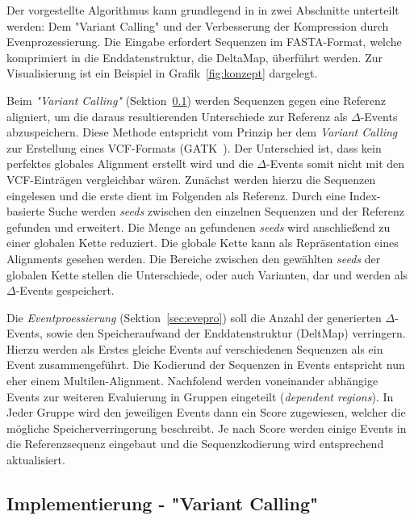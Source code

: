\documentclass[12pt]{article}
\begin{document}
Der vorgestellte Algorithmus kann grundlegend in in zwei Abschnitte unterteilt werden: Dem "Variant Calling" und der Verbesserung der Kompression durch Evenprozessierung. Die Eingabe erfordert Sequenzen im FASTA-Format, welche komprimiert in die Enddatenstruktur, die DeltaMap, überführt werden. Zur Visualisierung ist ein Beispiel in Grafik~\ref{fig:konzept} dargelegt.

Beim \emph{"Variant Calling"} (Sektion~\ref{sec:varcall}) werden Sequenzen gegen eine Referenz aligniert, um die daraus resultierenden Unterschiede zur Referenz als $\Delta$-Events abzuspeichern. Diese Methode entspricht vom Prinzip her dem \textit{Variant Calling} zur Erstellung eines VCF-Formats (GATK~\cite{GATK:variantcalling}). Der Unterschied ist, dass kein perfektes globales Alignment erstellt wird und die $\Delta$-Events somit nicht mit den VCF-Einträgen vergleichbar wären.
Zunächst werden hierzu die Sequenzen eingelesen und die erste dient im Folgenden als Referenz. Durch eine Index-basierte Suche werden \textit{seeds} zwischen den einzelnen Sequenzen und der Referenz gefunden und erweitert. Die Menge an gefundenen \textit{seeds} wird anschließend zu einer globalen Kette reduziert. Die globale Kette kann als Repräsentation eines Alignments gesehen werden. Die Bereiche zwischen den gewählten \textit{seeds} der globalen Kette stellen die Unterschiede, oder auch Varianten, dar und werden als $\Delta$-Events gespeichert.

Die \emph{Eventproessierung} (Sektion~\ref{sec:evepro}) soll die Anzahl der generierten $\Delta$-Events, sowie den Speicheraufwand der Enddatenstruktur (DeltMap) verringern. Hierzu werden als Erstes gleiche Events auf verschiedenen Sequenzen als ein Event zusammengeführt. Die Kodierund der Sequenzen in Events entspricht nun eher einem Multilen-Alignment. Nachfolend werden voneinander abhängige Events zur weiteren Evaluierung in Gruppen eingeteilt (\textit{dependent regions}). In Jeder Gruppe wird den jeweiligen Events dann ein Score zugewiesen, welcher die mögliche Speicherverringerung beschreibt. Je nach Score werden einige Events in die Referenzsequenz eingebaut und die Sequenzkodierung wird entsprechend aktualisiert. 

\subsection{Implementierung - "Variant Calling"}
\label{sec:varcall}
\end{document}
